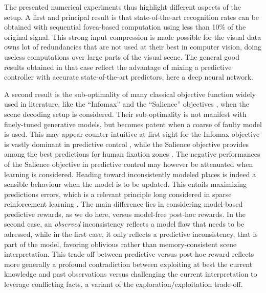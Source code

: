\documentclass[12pt,twoside,openright]{article}
\begin{document}
The presented numerical experiments thus highlight different aspects of the setup. 
A first and principal result is that state-of-the-art recognition rates can be obtained with sequential fovea-based computation using less than 10\% of the original signal. This strong input compression is made possible for the visual data owns lot of redundancies that are not used at their best in computer vision, doing useless computations over large parts of the visual scene. The general good results obtained in that case reflect the advantage of mixing a predictive controller with accurate state-of-the-art predictors, here a deep neural network. 

A second result is the sub-optimality of many classical objective function widely used in literature, like the ``Infomax'' \citep{butko2010infomax} and the ``Salience'' objectives \citep{itti2005bayesian}, when the scene decoding setup is considered. Their sub-optimality is not manifest with finely-tuned generative models, but becomes patent when a coarse of faulty model is used.
This may appear counter-intuitive at first sight for the Infomax objective is vastly dominant in predictive control \citep{najemnik2009simple}, while the Salience objective provides among the best predictions for human fixation zones \citep{itti2005bayesian}. The negative performances of the Salience objective in predictive control may however be attenuated when learning is considered. Heading toward inconsistently modeled places is indeed a sensible behaviour when the model is to be updated. This entails maximizing predictions errors, which is a relevant principle long considered in sparse reinforcement learning \citep{schmidhuber1991curious,oudeyer2008can,pathak2017curiosity}. The main difference lies in considering model-based predictive rewards, as we do here, versus model-free post-hoc rewards. In the second case, an \emph{observed} inconsistency reflects a model flaw that needs to be adressed, while in the first case, it only reflects a predictive inconsistency, that is part of the model, favoring oblivious rather than memory-consistent scene interpretation. This trade-off between predictive versus post-hoc reward reflects more generally a profound contradiction between exploiting at best the current knowledge and past observations versus challenging the current interpretation to leverage conflicting facts, a variant of the exploration/exploitation trade-off. 
\end{document}
